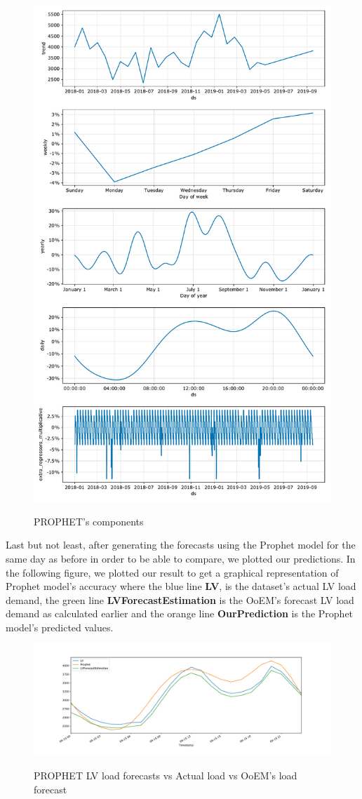 \begin{figure}[h!]
\centering
\includegraphics[width=0.7\linewidth]{project/download.pdf}
\label{fig:felix}
\caption{PROPHET's components}
\end{figure}
\newpage
Last but not least, after generating the forecasts using the Prophet model for the same day as before in order to be able to compare, we plotted our predictions.
In the following figure, we plotted our result to get a graphical representation of Prophet model's accuracy where the blue line \textbf{LV}, is the dataset's actual LV load demand, the green line \textbf{LVForecastEstimation} is the OoEM's forecast LV load demand as calculated earlier and the orange line \textbf{OurPrediction} is the Prophet model's predicted values. 
\begin{figure}[h!]
\centering
\includegraphics[width=1\linewidth]{project/prophet2.pdf}
\label{fig:felix}
\caption{PROPHET LV load forecasts vs Actual load vs OoEM's load forecast}
\end{figure}
